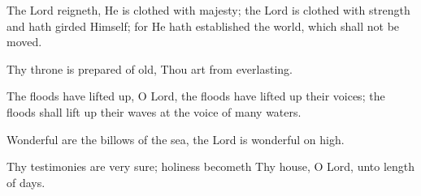 The Lord reigneth, He is clothed with majesty; the Lord is clothed with strength and hath girded Himself; for He hath established the world, which shall not be moved.

Thy throne is prepared of old, Thou art from everlasting.

The floods have lifted up, O Lord, the floods have lifted up their voices; the floods shall lift up their waves at the voice of many waters.

Wonderful are the billows of the sea, the Lord is wonderful on high.

Thy testimonies are very sure; holiness becometh Thy house, O Lord, unto length of days.
